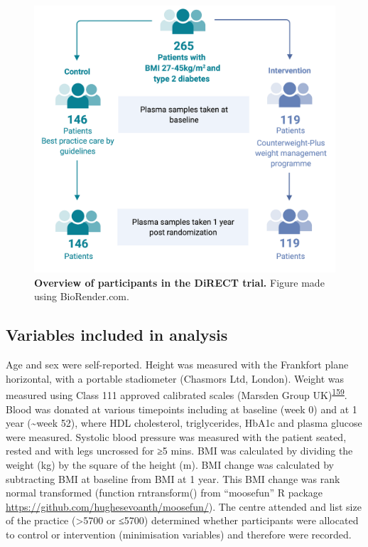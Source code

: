 \documentclass[11pt,twoside]{bristolthesis}
\begin{document}
\begin{figure}
\includegraphics{figure/DiRECT/DiRECT_study_summary} \caption[Overview of participants in the DiRECT trial]{\textbf{Overview of participants in the DiRECT trial.} Figure made using BioRender.com.}\label{fig:direct-participants}
\end{figure}
\hypertarget{variables-included-in-analysis}{%
\subsection{Variables included in analysis}\label{variables-included-in-analysis}}

Age and sex were self-reported. Height was measured with the Frankfort plane horizontal, with a portable stadiometer (Chasmors Ltd, London). Weight was measured using Class 111 approved calibrated scales (Marsden Group UK)\textsuperscript{\protect\hyperlink{ref-Leslie2016}{159}}. Blood was donated at various timepoints including at baseline (week 0) and at 1 year (\textasciitilde week 52), where HDL cholesterol, triglycerides, HbA1c and plasma glucose were measured. Systolic blood pressure was measured with the patient seated, rested and with legs uncrossed for ≥5 mins. BMI was calculated by dividing the weight (kg) by the square of the height (m). BMI change was calculated by subtracting BMI at baseline from BMI at 1 year. This BMI change was rank normal transformed (function rntransform() from ``moosefun'' R package \url{https://github.com/hughesevoanth/moosefun/}). The centre attended and list size of the practice (\textgreater5700 or ≤5700) determined whether participants were allocated to control or intervention (minimisation variables) and therefore were recorded.
\end{document}
